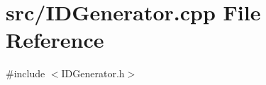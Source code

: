 \section{src/\+I\+D\+Generator.cpp File Reference}
\label{_i_d_generator_8cpp}
{\ttfamily \#include $<$I\+D\+Generator.\+h$>$}\newline
